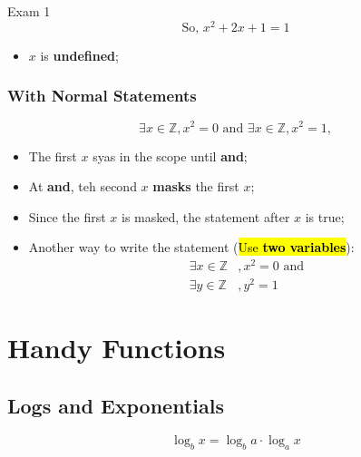 \documentclass{note}
\begin{document}
\begin{note}{Exam 1}
        \begin{displaymath}
            \text{So, } x^{2} + 2x + 1 = 1
        \end{displaymath}

        \begin{itemize}
            \item $ x $ is \textbf{undefined};
        \end{itemize}

        \subsubsection{With Normal Statements}

        \begin{displaymath}
            \exists x \in \mathbb{Z}, x^{2} = 0 \text{ and } \exists x \in \mathbb{Z}, x^{2} = 1, 
        \end{displaymath}

        \begin{itemize}
            \item The first $ x $ syas in the scope until \textbf{and};
            \item At \textbf{and}, teh second $ x $ \textbf{masks} the first $ x $;
            \item Since the first $ x $ is masked, the statement after $ x $ is true;

            \item Another way to write the statement (\hl{Use \textbf{two variables}}):
            \begin{align*}
                \exists x \in \mathbb{Z} &, x^{2} = 0 \text{ and}\\
                \exists y \in \mathbb{Z} &, y^{2} = 1
            \end{align*}
        \end{itemize}


        \section{Handy Functions}

        \subsection{Logs and Exponentials}
        \begin{displaymath}
            \log_{b}x = \log_{b} a \cdot \log_{a} x
        \end{displaymath}


\end{note}
\end{document}
